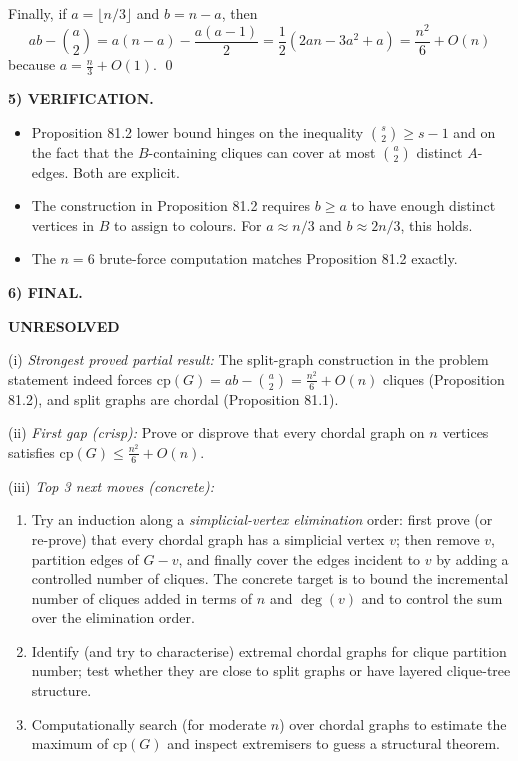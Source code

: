 Finally, if $a=\lfloor n/3\rfloor$ and $b=n-a$, then
\[
ab-\binom{a}{2}=a(n-a)-\frac{a(a-1)}{2}=\frac{1}{2}(2an-3a^2+a)=\frac{n^2}{6}+O(n)
\]
because $a=\frac{n}{3}+O(1)$. \qed

\medskip
\noindent\textbf{5) VERIFICATION.}

\begin{itemize}
\item Proposition 81.2 lower bound hinges on the inequality $\binom{s}{2}\ge s-1$ and on the fact that the $B$-containing cliques can cover at most $\binom{a}{2}$ distinct $A$-edges. Both are explicit.
\item The construction in Proposition 81.2 requires $b\ge a$ to have enough distinct vertices in $B$ to assign to colours. For $a\approx n/3$ and $b\approx 2n/3$, this holds.
\item The $n=6$ brute-force computation matches Proposition 81.2 exactly.
\end{itemize}

\medskip
\noindent\textbf{6) FINAL.}

\textbf{UNRESOLVED}

(i) \emph{Strongest proved partial result:} The split-graph construction in the problem statement indeed forces $\mathrm{cp}(G)=ab-\binom{a}{2}=\frac{n^2}{6}+O(n)$ cliques (Proposition 81.2), and split graphs are chordal (Proposition 81.1).

(ii) \emph{First gap (crisp):} Prove or disprove that every chordal graph on $n$ vertices satisfies $\mathrm{cp}(G)\le \frac{n^2}{6}+O(n)$.

(iii) \emph{Top 3 next moves (concrete):}
\begin{enumerate}
\item Try an induction along a \emph{simplicial-vertex elimination} order: first prove (or re-prove) that every chordal graph has a simplicial vertex $v$; then remove $v$, partition edges of $G-v$, and finally cover the edges incident to $v$ by adding a controlled number of cliques. The concrete target is to bound the incremental number of cliques added in terms of $n$ and $\deg(v)$ and to control the sum over the elimination order.
\item Identify (and try to characterise) extremal chordal graphs for clique partition number; test whether they are close to split graphs or have layered clique-tree structure.
\item Computationally search (for moderate $n$) over chordal graphs to estimate the maximum of $\mathrm{cp}(G)$ and inspect extremisers to guess a structural theorem.
\end{enumerate}

